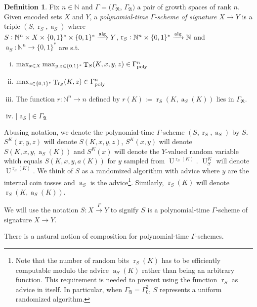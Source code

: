 \documentclass{article}
\numberwithin{equation}{section}
\theoremstyle{definition}
\newtheorem{definition}{Definition}[section]
\theoremstyle{plain}
\newcommand{\Bool}{\{0,1\}}
\newcommand{\Words}{{\Bool^*}}
\DeclareMathOperator{\T}{T}
\DeclareMathOperator{\R}{r}
\DeclareMathOperator{\A}{a}
\DeclareMathOperator{\Un}{U}
\newcommand{\Nats}{\mathbb{N}}
\newcommand{\NatFun}{\Nats^n \rightarrow}
\newcommand{\Abs}[1]{\lvert #1 \rvert}
\newcommand{\GrowR}{\Gamma_{\mathfrak{R}}}
\newcommand{\GrowA}{\Gamma_{\mathfrak{A}}}
\newcommand{\GammaPoly}{\Gamma_{\textnormal{poly}}}
\newcommand{\Alg}{\xrightarrow{\textnormal{alg}}}
\newcommand{\Scheme}{\xrightarrow{\Gamma}}
\begin{document}
\begin{samepage}
\begin{definition}

Fix $n \in \Nats$ and $\Gamma=(\GrowR$, $\GrowA)$ a pair of growth spaces of rank $n$. Given encoded sets $X$ and $Y$, a \emph{polynomial-time $\Gamma$-scheme of signature $X \rightarrow Y$} is a triple $(S,\R_S,\A_S)$ where\\ ${S: \Nats^n \times X \times \Words \times \Words \Alg Y}$, $\R_S: \Nats^n \times \Words \Alg \Nats$ and $\A_S: \NatFun \Words$ are s.t.

\begin{enumerate}[(i)]

\item $\max_{x \in X} \max_{y,z \in \Words} \T_S(K,x,y,z) \in \GammaPoly^n$

\item $\max_{z \in \Words} \T_{\R_S}(K,z) \in \GammaPoly^n$

\item The function $r: \NatFun n$ defined by $r(K):=\R_S(K,\A_S(K))$ lies in $\GrowR$.

\item $\Abs{\A_S} \in \GrowA$

\end{enumerate}

Abusing notation, we denote the polynomial-time $\Gamma$-scheme $(S,\R_S,\A_S)$ by $S$. $S^K(x,y,z)$ will denote $S(K,x,y,z)$, $S^K(x,y)$ will denote $S(K,x,y,\A_S(K))$ and $S^K(x)$ will denote the $Y$-valued random variable which equals $S(K,x,y,a(K))$ for $y$ sampled from $\Un^{\R_S(K)}$. $\Un_S^K$ will denote $\Un^{\R_S(K)}$. We think of $S$ as a randomized algorithm with advice where $y$ are the internal coin tosses and $\A_S$ is the advice\footnote{Note that the number of random bits $\R_S(K)$ has to be efficiently computable modulo the advice $\A_S(K)$ rather than being an arbitrary function. This requirement is needed to prevent using the function $\R_S$ as advice in itself. In particular, when $\GrowA=\Gamma_0^2$, $S$ represents a uniform randomized algorithm.}. Similarly, $\R_S(K)$ will denote $\R_S(K,\A_S(K))$.

We will use the notation $S: X \Scheme Y$ to signify $S$ is a polynomial-time $\Gamma$-scheme of signature $X \rightarrow Y$.

\end{definition}
\end{samepage}

There is a natural notion of composition for polynomial-time $\Gamma$-schemes.
\end{document}

